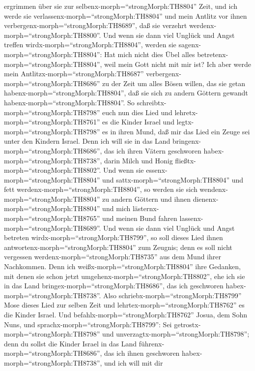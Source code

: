 ergrimmen über sie zur selbenx-morph=``strongMorph:TH8804'' Zeit, und
ich werde sie verlassenx-morph=``strongMorph:TH8804'' und mein Antlitz
vor ihnen verbergenx-morph=``strongMorph:TH8689'', daß sie verzehrt
werdenx-morph=``strongMorph:TH8800''. Und wenn sie dann viel Unglück und
Angst treffen wirdx-morph=``strongMorph:TH8804'', werden sie
sagenx-morph=``strongMorph:TH8804'': Hat mich nicht dies Übel alles
betretenx-morph=``strongMorph:TH8804'', weil mein Gott nicht mit mir
ist?  Ich aber werde mein
Antlitzx-morph=``strongMorph:TH8687''
verbergenx-morph=``strongMorph:TH8686'' zu der Zeit um alles Bösen
willen, das sie getan habenx-morph=``strongMorph:TH8804'', daß sie sich
zu andern Göttern gewandt habenx-morph=``strongMorph:TH8804''.
 So schreibtx-morph=``strongMorph:TH8798'' euch nun dies
Lied und lehretx-morph=``strongMorph:TH8761'' es die Kinder Israel und
legtx-morph=``strongMorph:TH8798'' es in ihren Mund, daß mir das Lied
ein Zeuge sei unter den Kindern Israel.  Denn ich will sie
in das Land bringenx-morph=``strongMorph:TH8686'', das ich ihren Vätern
geschworen habex-morph=``strongMorph:TH8738'', darin Milch und Honig
fließtx-morph=``strongMorph:TH8802''. Und wenn sie
essenx-morph=``strongMorph:TH8804'' und
sattx-morph=``strongMorph:TH8804'' und fett
werdenx-morph=``strongMorph:TH8804'', so werden sie sich
wendenx-morph=``strongMorph:TH8804'' zu andern Göttern und ihnen
dienenx-morph=``strongMorph:TH8804'' und mich
lästernx-morph=``strongMorph:TH8765'' und meinen Bund fahren
lassenx-morph=``strongMorph:TH8689''.  Und wenn sie dann
viel Unglück und Angst betreten wirdx-morph=``strongMorph:TH8799'', so
soll dieses Lied ihnen antwortenx-morph=``strongMorph:TH8804'' zum
Zeugnis; denn es soll nicht vergessen
werdenx-morph=``strongMorph:TH8735'' aus dem Mund ihrer Nachkommen. Denn
ich weißx-morph=``strongMorph:TH8804'' ihre Gedanken, mit denen sie
schon jetzt umgehenx-morph=``strongMorph:TH8802'', ehe ich sie in das
Land bringex-morph=``strongMorph:TH8686'', das ich geschworen
habex-morph=``strongMorph:TH8738''.  Also
schriebx-morph=``strongMorph:TH8799'' Mose dieses Lied zur selben Zeit
und lehrtex-morph=``strongMorph:TH8762'' es die Kinder Israel.
 Und befahlx-morph=``strongMorph:TH8762'' Josua, dem Sohn
Nuns, und sprachx-morph=``strongMorph:TH8799'': Sei
getrostx-morph=``strongMorph:TH8798'' und
unverzagtx-morph=``strongMorph:TH8798''; denn du sollst die Kinder
Israel in das Land führenx-morph=``strongMorph:TH8686'', das ich ihnen
geschworen habex-morph=``strongMorph:TH8738'', und ich will mit dir

